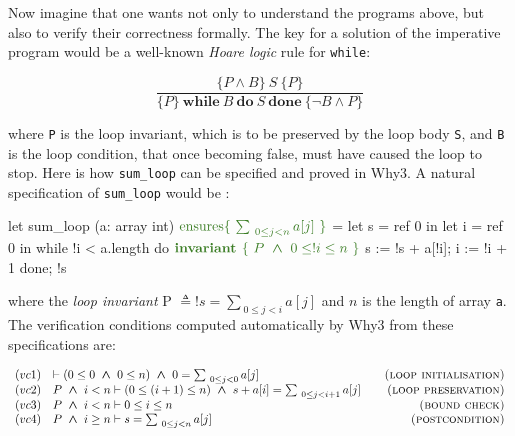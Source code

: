 \documentclass[a4paper,11pt,oneside]{article}
\theoremstyle{plain}
\newcommand{\bwedge}{\boldsymbol{~\wedge~}}
\begin{document}
	Now imagine that one wants not only to understand the programs above, but also to verify their correctness formally. 
	The key for a solution of the imperative program would be a well-known \textit{Hoare logic} rule for \texttt{while}:
\begin{small}
$$\frac { \{P \land B \}\ S\ \{P\} }
{ \{P \}\ \textbf{while}\ B\ \textbf{do}\ S\ \textbf{done}\ \{\neg B \land P\}}$$
\end{small} where \texttt{P} is the loop invariant, which is to be preserved by the loop body \texttt{S}, and \texttt{B} is the loop condition, that once becoming false, must have caused the loop to stop. Here is how \texttt{sum\_loop} can be specified and proved in Why3. 
A natural specification of \texttt{sum\_loop} would be :
%	
\begin{small}
	\begin{whycode}  
let sum_loop (a: array int) 	
  $\textcolor{OliveGreen}{\text{ensures}\{~\sum_{~0 \leq j < n} a[j]~\}}$ = 
  let s = ref 0 in
  let i = ref 0 in
  while !i < a.length do
    $\textcolor{OliveGreen}{\textbf{invariant }\{~P \bwedge 0 \leq !i \leq n~\}}$
    s := !s + a[!i];
    i := !i + 1
  done; !s 
 	\end{whycode}
 \end{small}
where the \textit{loop invariant} P $ \triangleq !s = \sum_{~0\leq j < i} a[j]$ and $n$ is the length of array \texttt{a}. 
The verification conditions computed automatically by Why3 from these specifications are:
\begin{footnotesize}
\begin{displaymath}
\begin{array}{ll@{\hspace*{2em}}r}


(vc1)
	& \vdash (0 \leq 0 \bwedge 0 \leq n) 
\bwedge 0 = \sum_{~0\leq j < 0} a[j]	
	& \textsc{(loop initialisation)} \\


(vc2)
	& P \bwedge i < n \vdash
		(0 \leq (i+1) \leq n) 
		\bwedge s + a[i] = \sum_{~0 \leq j < i+1} a[j]
	& \textsc{(loop preservation)} \\

(vc3)
	& P \bwedge i < n \vdash 0 \leq i \leq n 
	& \textsc{(bound check)} \\

(vc4)
	& P \bwedge i \geq n \vdash s = \sum_{~0 \leq j < n} a[j] 
	& \textsc{(postcondition)} 
\end{array}
\end{displaymath}
\end{footnotesize}
\end{document}
